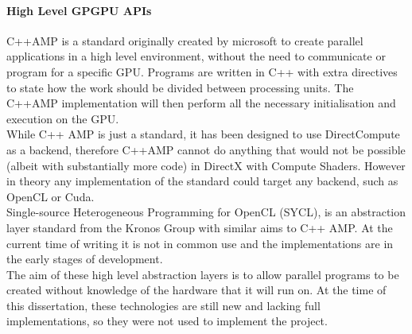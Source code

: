 \documentclass[12pt,a4paper]{article}
\begin{document}
\paragraph{High Level GPGPU APIs}
C++AMP is a standard originally created by microsoft to create parallel applications in a high level environment, without the need to communicate or program for a specific GPU. Programs are written in C++ with extra directives to state how the work should be divided between processing units. The C++AMP implementation will then perform all the necessary initialisation and execution on the GPU. 
\\
While C++ AMP is just a standard, it has been designed to use DirectCompute as a backend, therefore C++AMP cannot do anything that would not be possible (albeit with substantially more code) in DirectX with Compute Shaders. However in theory any implementation of the standard could target any backend, such as OpenCL or Cuda.
\\
Single-source Heterogeneous Programming for OpenCL (SYCL), is  an abstraction layer standard from the Kronos Group with similar aims to C++ AMP. At the current time of writing it is not in common use and the implementations are in the early stages of development.
\\
The aim of these high level abstraction layers is to allow parallel programs to be created without knowledge of the hardware that it will run on. At the time of this dissertation, these technologies are still new and lacking full implementations, so they were not used to implement the project.
\end{document}
